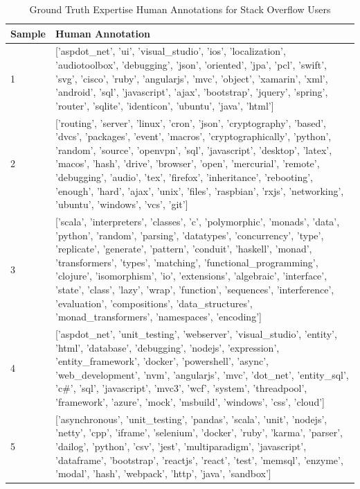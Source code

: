         \begin{center}
        \begin{longtable}{|p{1.5cm}|p{12.5cm}|}
        \caption{Ground Truth Expertise Human Annotations for Stack Overflow Users} \label{survey_SO_groundTruth} \\
        \hline
        \textbf{Sample} & \textbf{Human Annotation} \\
            \hline
            1 & ['aspdot\_net', 'ui', 'visual\_studio', 'ios', 'localization', 'audiotoolbox', 'debugging', 'json', 'oriented', 'jpa', 'pcl', 'swift', 'svg', 'cisco', 'ruby', 'angularjs', 'mvc', 'object', 'xamarin', 'xml', 'android', 'sql', 'javascript', 'ajax', 'bootstrap', 'jquery', 'spring', 'router', 'sqlite', 'identicon', 'ubuntu', 'java', 'html']  \\ 
            2 & ['routing', 'server', 'linux', 'cron', 'json', 'cryptography', 'based', 'dvcs', 'packages', 'event', 'macros', 'cryptographically', 'python', 'random', 'source', 'openvpn', 'sql', 'javascript', 'desktop', 'latex', 'macos', 'hash', 'drive', 'browser', 'open', 'mercurial', 'remote', 'debugging', 'audio', 'tex', 'firefox', 'inheritance', 'rebooting', 'enough', 'hard', 'ajax', 'unix', 'files', 'raspbian', 'rxjs', 'networking', 'ubuntu', 'windows', 'vcs', 'git']  \\ 
            3 & ['scala', 'interpreters', 'classes', 'c', 'polymorphic', 'monads', 'data', 'python', 'random', 'parsing', 'datatypes', 'concurrency', 'type', 'replicate', 'generate', 'pattern', 'conduit', 'haskell', 'monad', 'transformers', 'types', 'matching', 'functional\_programming', 'clojure', 'isomorphism', 'io', 'extensions', 'algebraic', 'interface', 'state', 'class', 'lazy', 'wrap', 'function', 'sequences', 'interference', 'evaluation', 'compositions', 'data\_structures', 'monad\_transformers', 'namespaces', 'encoding']  \\ 
            4 & ['aspdot\_net', 'unit\_testing', 'webserver', 'visual\_studio', 'entity', 'html', 'database', 'debugging', 'nodejs', 'expression', 'entity\_framework', 'docker', 'powershell', 'async', 'web\_development', 'nvm', 'angularjs', 'mvc', 'dot\_net', 'entity\_sql', 'c\#', 'sql', 'javascript', 'mvc3', 'wcf', 'system', 'threadpool', 'framework', 'azure', 'mock', 'msbuild', 'windows', 'css', 'cloud']  \\ 
            5 & ['asynchronous', 'unit\_testing', 'pandas', 'scala', 'unit', 'nodejs', 'netty', 'cpp', 'iframe', 'selenium', 'docker', 'ruby', 'karma', 'parser', 'dailog', 'python', 'csv', 'jest', 'multiparadigm', 'javascript', 'dataframe', 'bootstrap', 'reactjs', 'react', 'test', 'memsql', 'enzyme', 'modal', 'hash', 'webpack', 'http', 'java', 'sandbox']  \\ 

\end{longtable}
\end{center}
